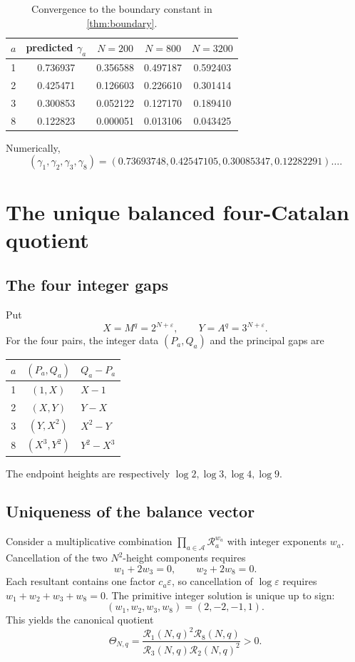 \documentclass[11pt]{article}
\theoremstyle{definition}
\theoremstyle{remark}
\newcommand{\eps}{\varepsilon}
\newcommand{\GammaOne}{0.73693748}
\newcommand{\GammaTwo}{0.42547105}
\newcommand{\GammaThree}{0.30085347}
\newcommand{\GammaEight}{0.12282291}
\begin{document}
\begin{table}[ht]
\centering
\begin{tabular}{c@{\qquad}c@{\qquad}ccc}
\toprule
\(a\) & predicted \(\gamma_a\) & \(N=200\) & \(N=800\) & \(N=3200\)\\
\midrule
1 & 0.736937 & 0.356588 & 0.497187 & 0.592403 \\
2 & 0.425471 & 0.126603 & 0.226610 & 0.301414 \\
3 & 0.300853 & 0.052122 & 0.127170 & 0.189410 \\
8 & 0.122823 & 0.000051 & 0.013106 & 0.043425 \\
\bottomrule
\end{tabular}
\caption{Convergence to the boundary constant in \cref{thm:boundary}.}
\end{table}

Numerically,
\[
(\gamma_1,\gamma_2,\gamma_3,\gamma_8)
=(\GammaOne,\GammaTwo,\GammaThree,\GammaEight)\ldots.
\]

\section{The unique balanced four-Catalan quotient}\label{sec:balanced}

\subsection{The four integer gaps}
Put
\[
X=M^q=2^{N+\eps},\qquad Y=A^q=3^{N+\eps}.
\]
For the four pairs, the integer data \((P_a,Q_a)\) and the principal gaps are
\begin{center}
\begin{tabular}{ccl}
\toprule
\(a\) & \((P_a,Q_a)\) & \(Q_a-P_a\)\\
\midrule
1 & \((1,X)\) & \(X-1\)\\
2 & \((X,Y)\) & \(Y-X\)\\
3 & \((Y,X^2)\) & \(X^2-Y\)\\
8 & \((X^3,Y^2)\) & \(Y^2-X^3\)\\
\bottomrule
\end{tabular}
\end{center}
The endpoint heights are respectively
\(\log2,\log3,\log4,\log9\).

\subsection{Uniqueness of the balance vector}
Consider a multiplicative combination
\(\prod_{a\in\mathcal A}\mathscr R_a^{w_a}\) with integer exponents \(w_a\).  Cancellation of the two \(N^2\)-height components requires
\[
w_1+2w_3=0,\qquad w_2+2w_8=0.
\]
Each resultant contains one factor \(c_a\eps\), so cancellation of \(\log\eps\) requires
\(w_1+w_2+w_3+w_8=0\).  The primitive integer solution is unique up to sign:
\begin{equation}\label{eq:balance-vector}
(w_1,w_2,w_3,w_8)=(2,-2,-1,1).
\end{equation}
This yields the canonical quotient
\begin{equation}\label{eq:theta}
\Theta_{N,q}
=\frac{\mathscr R_1(N,q)^2\mathscr R_8(N,q)}
{\mathscr R_3(N,q)\mathscr R_2(N,q)^2}>0.
\end{equation}
\end{document}
